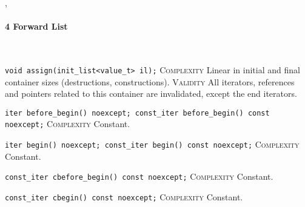 \sep
{}
\paragraph{4 Forward List}\mbox{}\vspace{0.5em}\\
\noindent{}\hspace*{0.25em}\lstinline[basicstyle=\ttfamily\color{corange}]{void assign(init_list<value_t> il);} \textsc{Complexity} Linear in initial and final container sizes (destructions, constructions). \textsc{Validity} All iterators, references and pointers related to this container are invalidated, except the end iterators.\\\vspace{-0.6em}

\noindent{}\hspace*{0.25em}\lstinline[basicstyle=\ttfamily\color{cgreen}]{iter before_begin() noexcept; const_iter before_begin() const noexcept;} \textsc{Complexity} Constant.\\\vspace{-0.6em}

\noindent{}\hspace*{0.25em}\lstinline[basicstyle=\ttfamily\color{cgreen}]{iter begin() noexcept; const_iter begin() const noexcept;} \textsc{Complexity} Constant.\\\vspace{-0.6em}

\noindent{}\hspace*{0.25em}\lstinline[basicstyle=\ttfamily\color{cgreen}]{const_iter cbefore_begin() const noexcept;} \textsc{Complexity} Constant.\\\vspace{-0.6em}

\noindent{}\hspace*{0.25em}\lstinline[basicstyle=\ttfamily\color{cgreen}]{const_iter cbegin() const noexcept;} \textsc{Complexity} Constant.\\\vspace{-0.6em}

